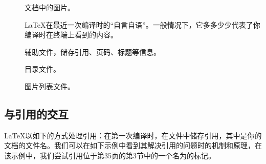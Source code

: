 \begin{description}
  \item[] 文档中的图片。
  \item[] \LaTeX 在最近一次编译时的“自言自语”。一般情况下，它多多少少代表了你编译时在终端上看到的内容。
  \item[] 辅助文件，储存引用、页码、标题等信息。
  \item[] 目录文件。
  \item[] 图片列表文件。
\end{description}

\subsection{与引用的交互}

\LaTeX 以如下的方式处理引用：在第一次编译时，在文件中储存引用，其中是你的文档的文件名。我们可以在如下示例中看到其解决引用的问题时的机制和原理，在该示例中，我们尝试引用位于第35页的第3节中的一个名为的标记。

